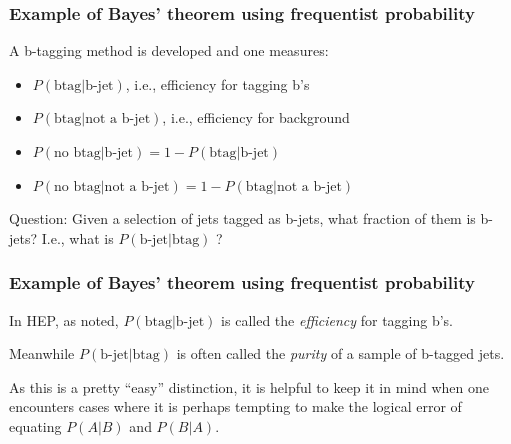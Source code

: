 \documentclass[9pt]{beamer}
\begin{document}
\begin{frame}
 \frametitle{Example of Bayes' theorem using frequentist probability}
 
 A b-tagging method is developed and one measures:
 
 \begin{itemize}
  \item $P(\text{btag} | \text{b-jet})$, i.e., efficiency for tagging b’s
  \item $P(\text{btag} | \text{not a b-jet})$, i.e., efficiency for background
  \item $P(\text{no btag} | \text{b-jet}) = 1 - P(\text{btag} | \text{b-jet})$
  \item $P(\text{no btag} | \text{not a b-jet}) = 1 - P(\text{btag} | \text{not a b-jet})$
 \end{itemize}
 
 \vspace{10pt}
 
Question: Given a selection of jets tagged as b-jets, what
fraction of them is b-jets? I.e., what is $P(\text{b-jet} | \text{btag})$ ?

\vspace{10pt}


\end{frame}
\begin{frame}
 \frametitle{Example of Bayes' theorem using frequentist probability}
 
 In HEP, as noted, $P(\text{btag} | \text{b-jet})$ is called the \emph{efficiency} for tagging b’s.
 
 Meanwhile $P(\text{b-jet} | \text{btag})$ is often called the \emph{purity} of a sample of b-tagged jets.
 
As this is a pretty ``easy'' distinction, it is helpful to keep it in mind when one encounters cases where it is perhaps tempting to make the logical error of equating $P(A|B)$ and $P(B|A)$.

\end{frame}
\end{document}
